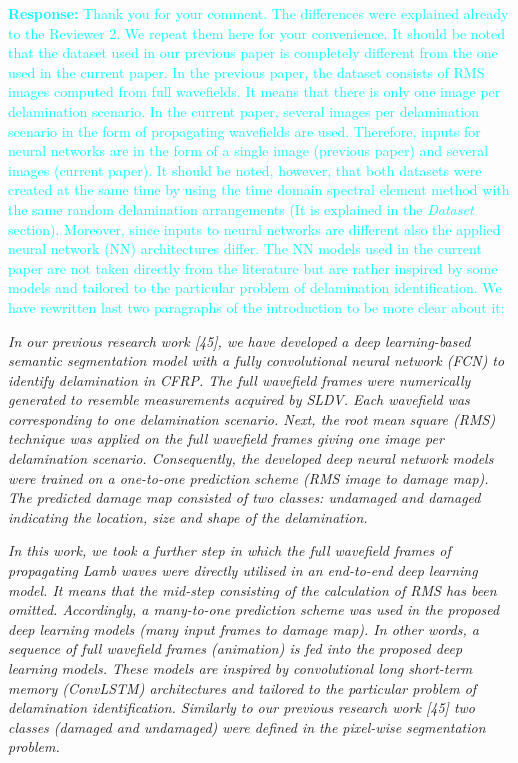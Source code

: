 \documentclass[11pt,a2paper]{report}
\begin{document}
	\textcolor{Cyan}{
		\textbf{Response:}
	Thank you for your comment. The differences were explained already to the Reviewer 2. We repeat them here for your convenience.
     It should be noted that the dataset used in our previous paper is completely different from the one used in the current paper. In the previous paper, the dataset consists of RMS images computed from full wavefields. It means that there is only one image per delamination scenario. In the current paper, several images per delamination scenario in the form of propagating wavefields are used. Therefore, inputs for neural networks are in the form of a single image (previous paper) and several images (current paper). It should be noted, however, that both datasets were created at the same time by using the time domain spectral element method with the same random delamination arrangements (It is explained in the \emph{Dataset} section).
    Moreover, since inputs to neural networks are different also the applied neural network (NN) architectures differ. The NN models used in the current paper are not taken directly from the literature but are rather inspired by some models and tailored to the particular problem of delamination identification.
    We have rewritten last two paragraphs of the introduction to be more clear about it:
}

\emph{In our previous research work [45], we have developed a deep learning-based
semantic segmentation model with a fully convolutional neural network (FCN)
to identify delamination in CFRP.	
The full wavefield frames were
numerically generated to resemble measurements acquired by SLDV.
Each wavefield was corresponding to one delamination scenario.
Next, the root mean square (RMS) technique
was applied on the full wavefield frames giving one image per delamination scenario.
Consequently,
the developed deep neural network models were trained on a one-to-one prediction scheme (RMS image to damage map).
The predicted damage map consisted of two classes: undamaged and damaged indicating the location, size and shape of the delamination.}

\emph{In this work, we took a further step in which the full wavefield frames of
propagating Lamb waves were directly utilised in an end-to-end
deep learning model.
It means that the mid-step consisting of the calculation of RMS has been omitted.
Accordingly, a many-to-one
prediction scheme was used in the proposed deep learning models (many input frames to damage map).
In other words, a sequence of full wavefield frames (animation) is fed into the proposed deep learning models.
These models are inspired by convolutional long short-term memory (ConvLSTM) architectures and tailored to the particular problem of delamination identification.
Similarly to our previous research work [45] two classes (damaged and undamaged) were defined in the pixel-wise segmentation problem.}
\end{document}
